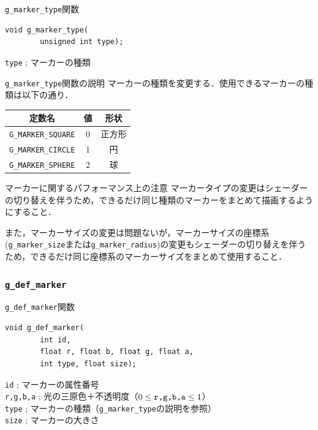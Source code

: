 \documentclass[platex,a4paper,12pt]{jsarticle}%
\begin{document}
\begin{itembox}[l]{\texttt{g\_marker\_type}関数}
\begin{verbatim}
void g_marker_type(
        unsigned int type);
\end{verbatim}
\verb|type| ; マーカーの種類
\end{itembox}

\begin{itembox}[l]{\texttt{g\_marker\_type}関数の説明}
マーカーの種類を変更する．使用できるマーカーの種類は以下の通り．
\begin{center}
\begin{tabular}{|c|c|c|}
	\hline 
	定数名 & 値 & 形状 \\ 
	\hline 
	\verb|G_MARKER_SQUARE| & 0 & 正方形 \\ 
	\hline 
	\verb|G_MARKER_CIRCLE| & 1 & 円 \\ 
	\hline 
	\verb|G_MARKER_SPHERE| & 2 & 球 \\ 
	\hline 
\end{tabular}
\end{center}
\end{itembox}

\begin{itembox}[l]{マーカーに関するパフォーマンス上の注意}
マーカータイプの変更はシェーダーの切り替えを伴うため，できるだけ同じ種類のマーカーをまとめて描画するようにすること．

また，マーカーサイズの変更は問題ないが，マーカーサイズの座標系(\verb|g_marker_size|または\verb|g_marker_radius|)の変更もシェーダーの切り替えを伴うため，できるだけ同じ座標系のマーカーサイズをまとめて使用すること．
\end{itembox}

\clearpage
\subsubsection{\texttt{g\_def\_marker}}

\begin{itembox}[l]{\texttt{g\_def\_marker}関数}
\begin{verbatim}
void g_def_marker(
        int id,
        float r, float b, float g, float a,
        int type, float size);
\end{verbatim}
\verb|id| ; マーカーの属性番号\\
\verb|r,g,b,a| ; 光の三原色＋不透明度（$0\leq \verb|r,g,b,a| \leq 1$）\\
\verb|type| ; マーカーの種類（\verb|g_marker_type|の説明を参照）\\
\verb|size| ; マーカーの大きさ
\end{itembox}
\end{document}
